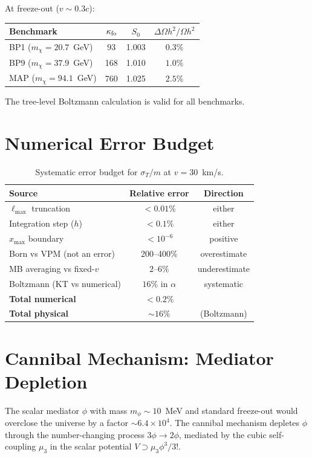 \documentclass[12pt,a4paper]{article}
\newcommand{\sigmaT}{\sigma_T}
\begin{document}
At freeze-out ($v \sim 0.3c$):
\begin{center}
\begin{tabular}{lccc}
\toprule
Benchmark & $\kappa_{\rm fo}$ & $S_0$ & $\Delta\Omega h^2/\Omega h^2$ \\
\midrule
BP1 ($m_\chi = 20.7$~GeV) & 93  & 1.003 & $0.3\%$ \\
BP9 ($m_\chi = 37.9$~GeV) & 168 & 1.010 & $1.0\%$ \\
MAP ($m_\chi = 94.1$~GeV) & 760 & 1.025 & $2.5\%$ \\
\bottomrule
\end{tabular}
\end{center}
The tree-level Boltzmann calculation is valid for all benchmarks.

\section{Numerical Error Budget}
\label{app:error_budget}

\begin{table}[h!]
\centering
\caption{Systematic error budget for $\sigmaT/m$ at $v = 30$~km/s.}
\label{tab:error_budget}
\begin{tabular}{lcc}
\toprule
Source & Relative error & Direction \\
\midrule
$\ell_{\max}$ truncation   & $< 0.01\%$  & either \\
Integration step ($h$)     & $< 0.1\%$   & either \\
$x_{\max}$ boundary        & $< 10^{-6}$ & positive \\
Born vs VPM (not an error) & 200--400\%  & overestimate \\
MB averaging vs fixed-$v$  & $2$--$6\%$  & underestimate \\
Boltzmann (KT vs numerical)& $16\%$ in $\alpha$ & systematic \\
\midrule
\textbf{Total numerical}   & $< 0.2\%$   & \\
\textbf{Total physical}    & $\sim 16\%$ & (Boltzmann) \\
\bottomrule
\end{tabular}
\end{table}

\section{Cannibal Mechanism: Mediator Depletion}
\label{app:cannibal}

The scalar mediator $\phi$ with mass $m_\phi \sim 10$~MeV and standard freeze-out
would overclose the universe by a factor $\sim 6.4 \times 10^4$. The cannibal
mechanism depletes $\phi$ through the number-changing process $3\phi \to 2\phi$,
mediated by the cubic self-coupling $\mu_3$ in the scalar potential
$V \supset \mu_3 \phi^3 / 3!$.
\end{document}
